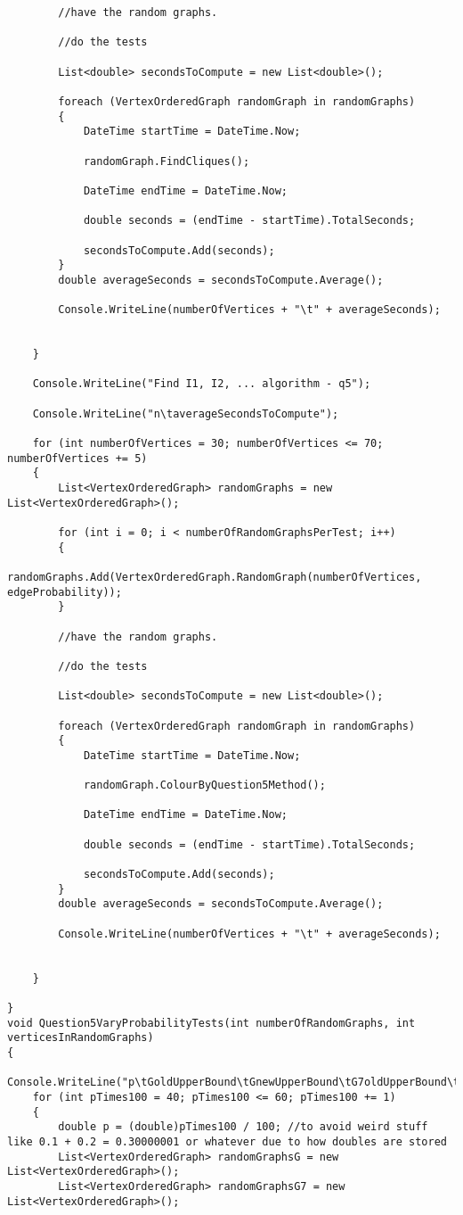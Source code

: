 \documentclass{article}
\begin{document}
\begin{lstlisting}
		//have the random graphs.
		
		//do the tests
		
		List<double> secondsToCompute = new List<double>();
		
		foreach (VertexOrderedGraph randomGraph in randomGraphs)
		{
			DateTime startTime = DateTime.Now;
			
			randomGraph.FindCliques();
			
			DateTime endTime = DateTime.Now;
			
			double seconds = (endTime - startTime).TotalSeconds;
			
			secondsToCompute.Add(seconds);
		}
		double averageSeconds = secondsToCompute.Average();
		
		Console.WriteLine(numberOfVertices + "\t" + averageSeconds);
		
		
	}
	
	Console.WriteLine("Find I1, I2, ... algorithm - q5");
	
	Console.WriteLine("n\taverageSecondsToCompute");
	
	for (int numberOfVertices = 30; numberOfVertices <= 70; numberOfVertices += 5)
	{
		List<VertexOrderedGraph> randomGraphs = new List<VertexOrderedGraph>();
		
		for (int i = 0; i < numberOfRandomGraphsPerTest; i++)
		{
			randomGraphs.Add(VertexOrderedGraph.RandomGraph(numberOfVertices, edgeProbability));
		}
		
		//have the random graphs.
		
		//do the tests
		
		List<double> secondsToCompute = new List<double>();
		
		foreach (VertexOrderedGraph randomGraph in randomGraphs)
		{
			DateTime startTime = DateTime.Now;
			
			randomGraph.ColourByQuestion5Method();
			
			DateTime endTime = DateTime.Now;
			
			double seconds = (endTime - startTime).TotalSeconds;
			
			secondsToCompute.Add(seconds);
		}
		double averageSeconds = secondsToCompute.Average();
		
		Console.WriteLine(numberOfVertices + "\t" + averageSeconds);
		
		
	}
	
}
void Question5VaryProbabilityTests(int numberOfRandomGraphs, int verticesInRandomGraphs)
{
	Console.WriteLine("p\tGoldUpperBound\tGnewUpperBound\tG7oldUpperBound\tG7newUpperBound");
	for (int pTimes100 = 40; pTimes100 <= 60; pTimes100 += 1)
	{
		double p = (double)pTimes100 / 100; //to avoid weird stuff like 0.1 + 0.2 = 0.30000001 or whatever due to how doubles are stored
		List<VertexOrderedGraph> randomGraphsG = new List<VertexOrderedGraph>();
		List<VertexOrderedGraph> randomGraphsG7 = new List<VertexOrderedGraph>();
		

\end{lstlisting}
\end{document}
